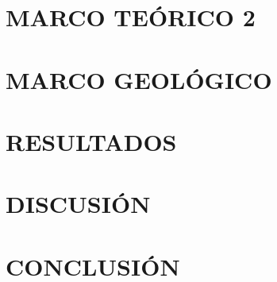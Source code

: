 \documentclass{report}
\begin{document}
	\chapter{MARCO TEÓRICO 2} \label{cap3}
	
	\chapter{MARCO GEOLÓGICO}
	
	\chapter{RESULTADOS}
	
	\chapter{DISCUSIÓN}
	
	\chapter{CONCLUSIÓN}
	
	\clearpage
	\renewcommand{\bibname}{REFERENCIAS}
	
	\setlength{\bibsep}{2em plus 0.5ex}
	\clearpage
	\appendix
	\renewcommand{\appendixname}{ANEXOS}
	\renewcommand{\appendixpagename}{ANEXOS}
	\renewcommand{\appendixtocname}{ANEXOS}
	\addappheadtotoc	
	
\end{document}
